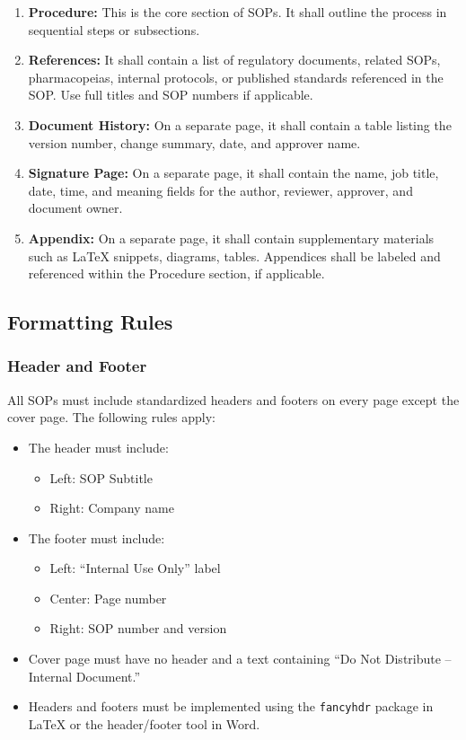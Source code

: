 \documentclass[11pt]{article}
\begin{document}
\begin{enumerate}
        \item \textbf{Procedure:} This is the core section of SOPs. It shall outline the process in sequential steps or subsections.
        \item \textbf{References:} It shall contain a list of regulatory documents, related SOPs, pharmacopeias, internal protocols, or published standards referenced in the SOP. Use full titles and SOP numbers if applicable.
        \item \textbf{Document History:} On a separate page, it shall contain a table listing the version number, change summary, date, and approver name.
        \item \textbf{Signature Page:} On a separate page, it shall contain the name, job title, date, time, and meaning fields for the author, reviewer, approver, and document owner.
        \item \textbf{Appendix:} On a separate page, it shall contain supplementary materials such as LaTeX snippets, diagrams, tables. Appendices shall be labeled and referenced within the Procedure section, if applicable.
    \end{enumerate}
\subsection{Formatting Rules}
\subsubsection{Header and Footer}
All SOPs must include standardized headers and footers on every page except the cover page. The following rules apply:
\begin{itemize}
    \item The header must include:
    \begin{itemize}
        \item Left: SOP Subtitle
        \item Right: Company name
    \end{itemize}
    \item The footer must include:
    \begin{itemize}
        \item Left: “Internal Use Only” label
        \item Center: Page number
        \item Right: SOP number and version
    \end{itemize}
    \item Cover page must have no header and a text containing “Do Not Distribute – Internal Document.”
    \item Headers and footers must be implemented using the \texttt{fancyhdr} package in LaTeX or the header/footer tool in Word.
\end{itemize}
\end{document}
